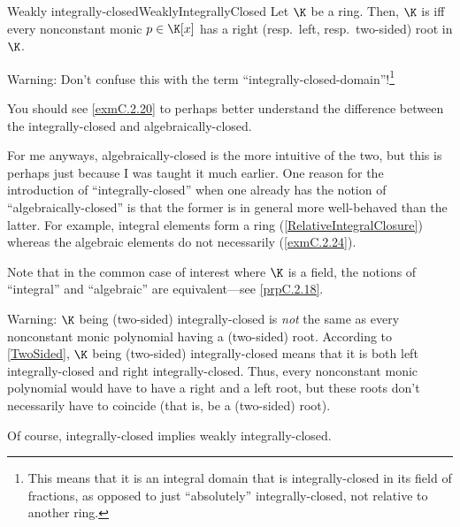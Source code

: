 \begin{dfn}{Weakly integrally-closed}{WeaklyIntegrallyClosed}
	Let $\K$ be a ring.  Then, $\K$ is  iff every nonconstant monic $p\in \K [x]$ has a right (resp.~left, resp.~two-sided) root in $\K$.
	\begin{rmk}
		Warning:  Don't confuse this with the term ``integrally-closed-domain''!\footnote{This means that it is an integral domain that is integrally-closed in its field of fractions, as opposed to just ``absolutely'' integrally-closed, not relative to another ring.}
	\end{rmk}
	\begin{rmk}
		You should see \cref{exmC.2.20} to perhaps better understand the difference between the integrally-closed and algebraically-closed.
		
		For me anyways, algebraically-closed is the more intuitive of the two, but this is perhaps just because I was taught it much earlier.  One reason for the introduction of ``integrally-closed'' when one already has the notion of ``algebraically-closed'' is that the former is in general more well-behaved than the latter.  For example, integral elements form a ring (\cref{RelativeIntegralClosure}) whereas the algebraic elements do not necessarily (\cref{exmC.2.24}).
	\end{rmk}
	\begin{rmk}
		Note that in the common case of interest where $\K$ is a field, the notions of ``integral'' and ``algebraic'' are equivalent---see \cref{prpC.2.18}.
	\end{rmk}
	\begin{rmk}
		Warning:  $\K$ being (two-sided) integrally-closed is \emph{not} the same as every nonconstant monic polynomial having a (two-sided) root.  According to \cref{TwoSided}, $\K$ being (two-sided) integrally-closed means that it is both left integrally-closed and right integrally-closed.  Thus, every nonconstant monic polynomial would have to have a right and a left root, but these roots don't necessarily have to coincide (that is, be a (two-sided) root).
	\end{rmk}
	\begin{rmk}
		Of course, integrally-closed implies weakly integrally-closed.
	\end{rmk}
\end{dfn}
